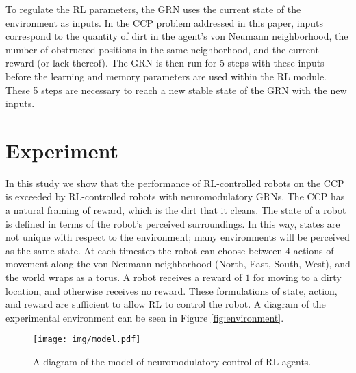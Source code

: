 \documentclass[conference]{IEEEtran}
\begin{document}
To regulate the RL parameters, the GRN uses the current state of the environment
as inputs. In the CCP problem addressed in this paper, inputs correspond to the
quantity of dirt in the agent's von Neumann neighborhood, the number of
obstructed positions in the same neighborhood, and the current reward (or lack
thereof). The GRN is then run for 5 steps with these inputs before the
learning and memory parameters are used within the RL module. These 5 steps are
necessary to reach a new stable state of the GRN with the new inputs.

\section{Experiment}

In this study we show that the performance of RL-controlled robots on the
CCP is exceeded by RL-controlled robots with neuromodulatory GRNs. The CCP
has a natural framing of reward, which is the dirt that it cleans. The state of
a robot is defined in terms of the robot's perceived surroundings.
In this way, states are not unique with respect to the environment; many
environments will be perceived as the same state. At each timestep the robot can
choose between 4 actions of movement along the von Neumann neighborhood (North,
East, South, West), and the world wraps as a torus. A robot receives a reward of $1$ for moving to a dirty
location, and otherwise receives no reward. These formulations of state, action,
and reward are sufficient to allow RL to control the robot. A diagram of the
experimental environment can be seen in Figure \ref{fig:environment}.

\begin{figure}
\center
\texttt{[image: img/model.pdf]}
\caption{A diagram of the model of neuromodulatory control of RL agents.}
\label{fig:model}
\end{figure}

\end{document}
